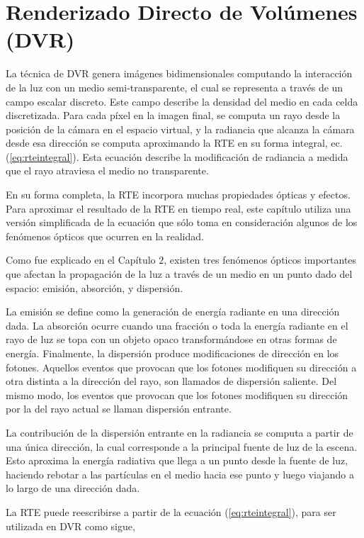 \section{Renderizado Directo de Volúmenes (DVR)}

La técnica de DVR genera imágenes bidimensionales computando la interacción de la luz con un medio semi-transparente, el cual se representa a través de un campo escalar discreto.
Este campo describe la densidad del medio en cada celda discretizada.
Para cada píxel en la imagen final, se computa un rayo desde la posición de la cámara en el espacio virtual, y la radiancia que alcanza la cámara desde esa dirección se computa aproximando la RTE en su forma integral, ec. (\ref{eq:rteintegral}).
Esta ecuación describe la modificación de radiancia a medida que el rayo atraviesa el medio no transparente.

En su forma completa, la RTE incorpora muchas propiedades ópticas y efectos.
Para aproximar el resultado de la RTE en tiempo real, este capítulo utiliza una versión simplificada de la ecuación que sólo toma en consideración algunos de los fenómenos ópticos que ocurren en la realidad.

Como fue explicado en el Capítulo $2$, existen tres fenómenos ópticos importantes que afectan la propagación de la luz a través de un medio en un punto dado del espacio: emisión, absorción, y dispersión.

La emisión se define como la generación de energía radiante en una dirección dada.
La absorción ocurre cuando una fracción o toda la energía radiante en el rayo de luz se topa con un objeto opaco transformándose en otras formas de energía.
Finalmente, la dispersión produce modificaciones de dirección en los fotones.
Aquellos eventos que provocan que los fotones modifiquen su dirección a otra distinta a la dirección del rayo, son llamados de dispersión saliente. Del mismo modo, los eventos que provocan que los fotones modifiquen su dirección por la del rayo actual se llaman dispersión entrante.

%
La contribución de la dispersión entrante en la radiancia se computa a partir de una única dirección, la cual corresponde a la principal fuente de luz de la escena.
Esto aproxima la energía radiativa que llega a un punto desde la fuente de luz, haciendo rebotar a las partículas en el medio hacia ese punto y luego viajando a lo largo de una dirección dada. 

La RTE puede reescribirse a partir de la ecuación (\ref{eq:rteintegral}), para ser utilizada en DVR como sigue,


